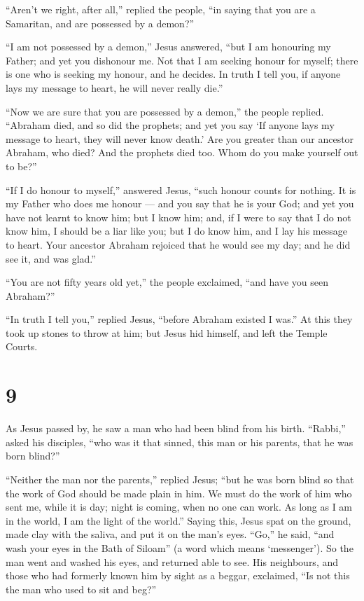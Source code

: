  ``Aren't we right, after all,'' replied the people, ``in
saying that you are a Samaritan, and are possessed by a demon?''

 ``I am not possessed by a demon,'' Jesus answered, ``but I
am honouring my Father; and yet you dishonour me.  Not that
I am seeking honour for myself; there is one who is seeking my honour,
and he decides.  In truth I tell you, if anyone lays my
message to heart, he will never really die.''

 ``Now we are sure that you are possessed by a demon,'' the
people replied. ``Abraham died, and so did the prophets; and yet you say
`If anyone lays my message to heart, they will never know death.'
 Are you greater than our ancestor Abraham, who died? And
the prophets died too. Whom do you make yourself out to be?''

 ``If I do honour to myself,'' answered Jesus, ``such
honour counts for nothing. It is my Father who does me honour --- and
you say that he is your God;  and yet you have not learnt
to know him; but I know him; and, if I were to say that I do not know
him, I should be a liar like you; but I do know him, and I lay his
message to heart.  Your ancestor Abraham rejoiced that he
would see my day; and he did see it, and was glad.''

 ``You are not fifty years old yet,'' the people exclaimed,
``and have you seen Abraham?''

 ``In truth I tell you,'' replied Jesus, ``before Abraham
existed I was.''  At this they took up stones to throw at
him; but Jesus hid himself, and left the Temple Courts.

\hypertarget{section-8}{%
\section{9}\label{section-8}}

 As Jesus passed by, he saw a man who had been blind from
his birth.  ``Rabbi,'' asked his disciples, ``who was it
that sinned, this man or his parents, that he was born blind?''

 ``Neither the man nor the parents,'' replied Jesus; ``but
he was born blind so that the work of God should be made plain in him.
 We must do the work of him who sent me, while it is day;
night is coming, when no one can work.  As long as I am in
the world, I am the light of the world.''  Saying this,
Jesus spat on the ground, made clay with the saliva, and put it on the
man's eyes.  ``Go,'' he said, ``and wash your eyes in the
Bath of Siloam'' (a word which means `messenger'). So the man went and
washed his eyes, and returned able to see.  His neighbours,
and those who had formerly known him by sight as a beggar, exclaimed,
``Is not this the man who used to sit and beg?''

